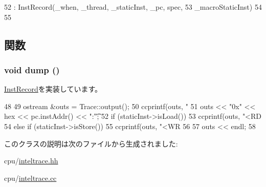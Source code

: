 \begin{DoxyCode}
52         : InstRecord(_when, _thread, _staticInst, _pc, spec,
53                 _macroStaticInst)
54     {
55     }
\end{DoxyCode}


\subsection{関数}
\hypertarget{classTrace_1_1IntelTraceRecord_accd2600060dbaee3a3b41aed4034c63c}{
\subsubsection[{dump}]{\setlength{\rightskip}{0pt plus 5cm}void dump ()}}
\label{classTrace_1_1IntelTraceRecord_accd2600060dbaee3a3b41aed4034c63c}


\hyperlink{classTrace_1_1InstRecord_abf1ad25f5e8a680b74ae28575b1f0539}{InstRecord}を実装しています。


\begin{DoxyCode}
48 {
49     ostream &outs = Trace::output();
50     ccprintf(outs, "%
51     outs << "0x" << hex << pc.instAddr() << ":\t";
52     if (staticInst->isLoad()) {
53         ccprintf(outs, "<RD %
54     } else if (staticInst->isStore()) {
55         ccprintf(outs, "<WR %
56     }
57     outs << endl;
58 }
\end{DoxyCode}


このクラスの説明は次のファイルから生成されました:\begin{DoxyCompactItemize}
\item 
cpu/\hyperlink{inteltrace_8hh}{inteltrace.hh}\item 
cpu/\hyperlink{inteltrace_8cc}{inteltrace.cc}\end{DoxyCompactItemize}
